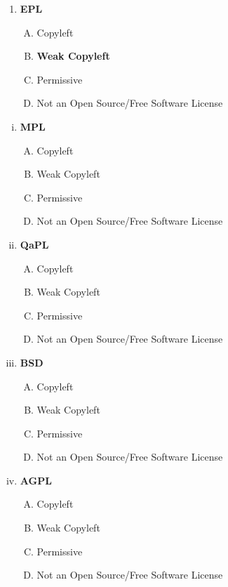 \documentclass[10pt]{article}
\begin{document}
\begin{enumerate}
\begin{enumerate}[a]
\item \textbf{EPL}

\begin{enumerate}[A.]
	\item Copyleft
	\item \textbf{Weak Copyleft}
	\item Permissive
	\item Not an Open Source/Free Software License
\end{enumerate}
	
\end{enumerate}
\else
\begin{enumerate}[i.]
	\item \textbf{MPL}

	\begin{enumerate}[A.]
		\item Copyleft
		\item Weak Copyleft
		\item Permissive
		\item Not an Open Source/Free Software License
	\end{enumerate}

	\item \textbf{QaPL}

\begin{enumerate}[A.]
	\item Copyleft
	\item Weak Copyleft
	\item Permissive
	\item Not an Open Source/Free Software License
\end{enumerate}

	\item \textbf{BSD}

\begin{enumerate}[A.]
	\item Copyleft
	\item Weak Copyleft
	\item Permissive
	\item Not an Open Source/Free Software License
\end{enumerate}

\item \textbf{AGPL}

\begin{enumerate}[A.]
	\item Copyleft
	\item Weak Copyleft
	\item Permissive
	\item Not an Open Source/Free Software License
\end{enumerate}


\end{enumerate}
\end{enumerate}
\end{document}
